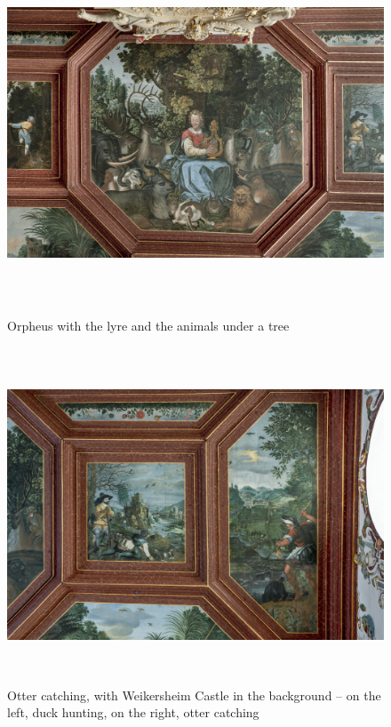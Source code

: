 \documentclass[
  a4paper,
]{book}
\begin{document}
\begin{figure}
\includegraphics[height=10cm]{images/fmd10024323a.jpg}

\caption{Orpheus with the lyre and the animals under a tree}
\label{fig:{images/fmd10024323a.jpg}}

\clearpage

\centering

\includegraphics[height=10cm]{images/fmd10024324a.jpg}

\caption{Otter catching, with Weikersheim Castle in the background – on the left, duck hunting, on the right, otter catching}
\label{fig:{images/fmd10024324a.jpg}}

\clearpage

\centering


\end{figure}
\end{document}
